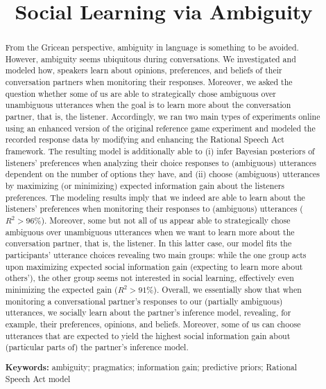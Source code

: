 \documentclass[10pt,a4paper]{article}
\title{Social Learning via Ambiguity}
\begin{document}
\maketitle

\begin{abstract}
From the Gricean perspective, ambiguity in language is something to be avoided. 
However, ambiguity seems ubiquitous during conversations. 
We investigated and modeled how, speakers learn about opinions, preferences, and beliefs of their conversation partners when monitoring their responses.
Moreover, we asked the question whether some of us are able to strategically chose ambiguous over unambiguous utterances when the goal is to learn more about the conversation partner, that is, the listener.
Accordingly, we ran two main types of experiments online using an enhanced version of the original reference game experiment \cite{frankgoodman2012} and modeled the recorded response data by modifying and enhancing the Rational Speech Act framework.
The resulting model is additionally able to 
(i) infer Bayesian posteriors of listeners' preferences when analyzing their choice responses to (ambiguous) utterances dependent on the number of options they have, and 
(ii) choose (ambiguous) utterances by maximizing (or minimizing) expected information gain about the listeners preferences. 
The modeling results imply that we indeed are able to learn about the listeners' preferences when monitoring their responses to (ambiguous) utterances ($R^2>96\%$).
Moreover, some but not all of us appear able to strategically chose ambiguous over unambiguous utterances when we want to learn more about the conversation partner, that is, the listener.
In this latter case, our model fits the participants' utterance choices revealing two main groups: while the one group acts upon maximizing expected social information gain (expecting to learn more about others'), the other group seems not interested in social learning, effectively even minimizing the expected gain ($R^2>91\%$). 
Overall, we essentially show that when monitoring a conversational partner's responses to our (partially ambiguous) utterances, we socially learn about the partner's inference model, revealing, for example, their preferences, opinions, and beliefs. 
Moreover, some of us can choose utterances that are expected to yield the highest social information gain about (particular parts of) the partner's inference model.

\textbf{Keywords:} 
ambiguity; pragmatics; information gain; predictive priors; Rational Speech Act model
\end{abstract}
\end{document}
